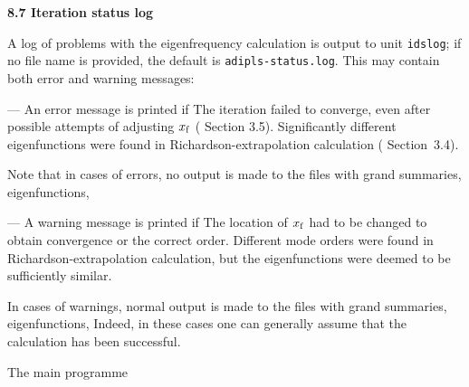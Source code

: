 \subsect
{\bf 8.7 Iteration status log}

A log of problems with the eigenfrequency calculation is
output to unit {\tt idslog};
if no file name is provided, the default is {\tt adipls-status.log}.
This may contain both error and warning messages:
\medskip
\item{---} An error message is printed if
\itemitem{-} 
The iteration failed to converge, even after possible
attempts of adjusting $x_{\rm f}$ ({\cf} Section 3.5).
\itemitem{-} 
Significantly different eigenfunctions were found in Richardson-extrapolation 
calculation ({\cf} Section~3.4).
\item{}
Note that in cases of errors, no output is made to 
the files with grand summaries, eigenfunctions, {\etc}
\medskip
\item{---} A warning message is printed if
\itemitem{-} 
The location of $x_{\rm f}$ had to be changed to obtain convergence or the
correct order.
\itemitem{-} 
Different mode orders were found in Richardson-extrapolation calculation,
but the eigenfunctions were deemed to be sufficiently similar.
\item{}
In cases of warnings, normal output is made to 
the files with grand summaries, eigenfunctions, {\etc}
Indeed, in these cases one can generally assume that the
calculation has been successful.

\mainsect
\centerline{ The main programme} 

